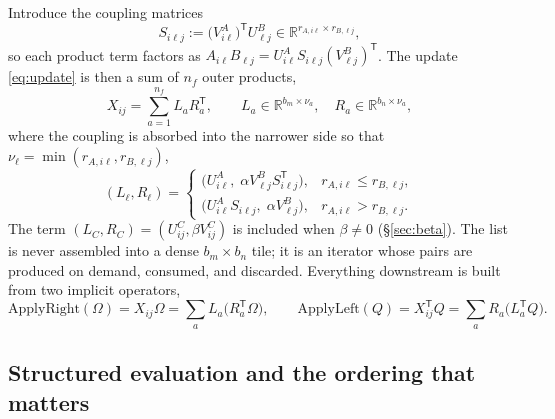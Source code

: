 \documentclass[11pt]{article}
\newcommand{\R}{\mathbb{R}}
\newcommand{\T}{\mathsf{T}}
\begin{document}
Introduce the coupling matrices
\begin{equation}
\label{eq:coupling}
S_{i\ell j}:=\bigl(V^A_{i\ell}\bigr)^{\T}U^B_{\ell j}
\in\R^{r_{A,i\ell}\times r_{B,\ell j}},
\end{equation}
so each product term factors as
$A_{i\ell}B_{\ell j}=U^A_{i\ell}S_{i\ell j}(V^B_{\ell j})^{\T}$. The update
\eqref{eq:update} is then a sum of $n_f$ outer products,
\begin{equation}
\label{eq:list}
X_{ij}=\sum_{a=1}^{n_f}L_aR_a^{\T},
\qquad
L_a\in\R^{b_m\times\nu_a},\quad R_a\in\R^{b_n\times\nu_a},
\end{equation}
where the coupling is absorbed into the narrower side so that
$\nu_\ell=\min(r_{A,i\ell},r_{B,\ell j})$,
\begin{equation}
\label{eq:absorb}
(L_\ell,R_\ell)=
\begin{cases}
\bigl(U^A_{i\ell},\;\alpha V^B_{\ell j}S_{i\ell j}^{\T}\bigr),
& r_{A,i\ell}\le r_{B,\ell j},\\[4pt]
\bigl(U^A_{i\ell}S_{i\ell j},\;\alpha V^B_{\ell j}\bigr),
& r_{A,i\ell}>r_{B,\ell j}.
\end{cases}
\end{equation}
The term $(L_C,R_C)=(U^C_{ij},\beta V^C_{ij})$ is included when $\beta\ne0$
(\S\ref{sec:beta}). The list is never assembled into a dense $b_m\times b_n$
tile; it is an iterator whose pairs are produced on demand, consumed, and
discarded. Everything downstream is built from two implicit operators,
\begin{equation}
\label{eq:apply}
\mathrm{ApplyRight}(\Omega)=X_{ij}\Omega=\sum_aL_a\bigl(R_a^{\T}\Omega\bigr),
\qquad
\mathrm{ApplyLeft}(Q)=X_{ij}^{\T}Q=\sum_aR_a\bigl(L_a^{\T}Q\bigr).
\end{equation}

\subsection{Structured evaluation and the ordering that matters}
\label{sec:ordering}
\end{document}

